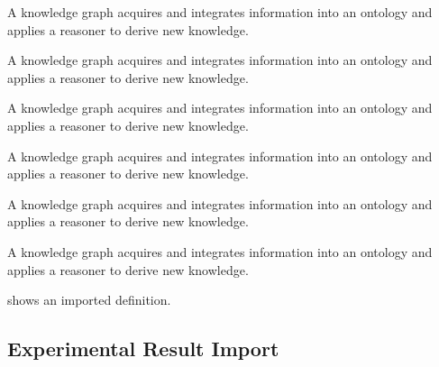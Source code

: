 \begin{definition}
\label{def:knowledge-graph14}
A knowledge graph acquires and integrates information into an ontology and applies a reasoner to derive new knowledge.
\end{definition}
\begin{definition}
\label{def:knowledge-graph15}
A knowledge graph acquires and integrates information into an ontology and applies a reasoner to derive new knowledge.
\end{definition}
\begin{definition}
\label{def:knowledge-graph16}
A knowledge graph acquires and integrates information into an ontology and applies a reasoner to derive new knowledge.
\end{definition}
\begin{definition}
\label{def:knowledge-graph17}
A knowledge graph acquires and integrates information into an ontology and applies a reasoner to derive new knowledge.
\end{definition}
\begin{definition}
\label{def:knowledge-graph18}
A knowledge graph acquires and integrates information into an ontology and applies a reasoner to derive new knowledge.
\end{definition}
\begin{definition}
\label{def:knowledge-graph19}
A knowledge graph acquires and integrates information into an ontology and applies a reasoner to derive new knowledge.
\end{definition}
 shows an imported definition.

\subsection{Experimental Result Import}

